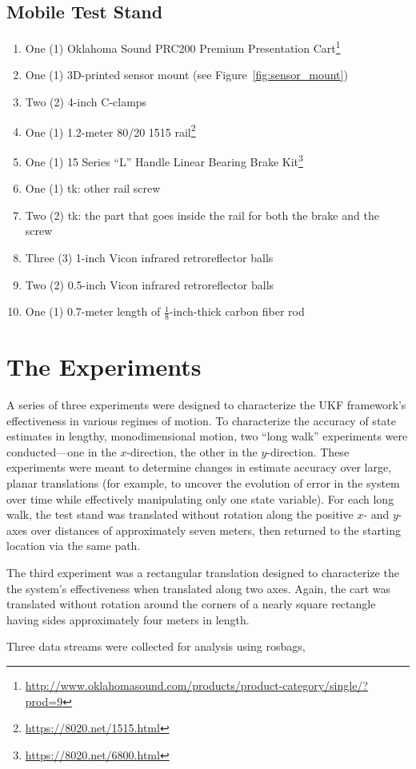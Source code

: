 \subsection{Mobile Test Stand}
\begin{enumerate}
\item One (1) Oklahoma Sound PRC200 Premium Presentation Cart\footnote{\url{http://www.oklahomasound.com/products/product-category/single/?prod=9}}
\item One (1) 3D-printed sensor mount (see Figure~\ref{fig:sensor_mount})
\item Two (2) 4-inch C-clamps
\item One (1) 1.2-meter 80/20 1515 rail\footnote{\url{https://8020.net/1515.html}}
\item One (1) 15 Series ``L'' Handle Linear Bearing Brake Kit\footnote{\url{https://8020.net/6800.html}}
\item One (1) tk: other rail screw
\item Two (2) tk: the part that goes inside the rail for both the brake and the screw
\item Three (3) 1-inch Vicon infrared retroreflector balls
\item Two (2) 0.5-inch Vicon infrared retroreflector balls
\item One (1) 0.7-meter length of $\frac{1}{8}$-inch-thick carbon fiber rod
\end{enumerate}


\section{The Experiments}

A series of three experiments were designed to characterize the UKF framework's effectiveness in various regimes of motion. To characterize the accuracy of state estimates in lengthy, monodimensional motion, two ``long walk'' experiments were conducted---one in the $x$-direction, the other in the $y$-direction. These experiments were meant to determine changes in estimate accuracy over large, planar translations (for example, to uncover the evolution of error in the system over time while effectively manipulating only one state variable). For each long walk, the test stand was translated without rotation along the positive $x$- and $y$-axes over distances of approximately seven meters, then returned to the starting location via the same path.

The third experiment was a rectangular translation designed to characterize the the system's effectiveness when translated along two axes. Again, the cart was translated without rotation around the corners of a nearly square rectangle having sides approximately four meters in length.

Three data streams were collected for analysis using rosbags, 